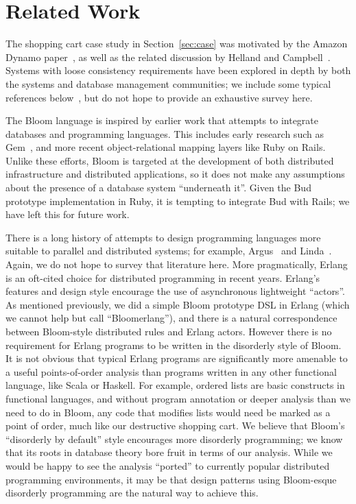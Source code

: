 \section{Related Work}
\label{sec:relwork}
The shopping cart case study in Section~\ref{sec:case} was motivated by the
Amazon Dynamo paper~\cite{dynamo}, as well as the related discussion by Helland
and Campbell~\cite{quicksand}. Systems with loose consistency requirements have
been explored in depth by both the systems and database management communities; we include some typical references below~\cite{sagas,gray1996dangers,leases,bayou}, but do not hope to provide an exhaustive survey here.

The Bloom language is inspired by earlier work that attempts to integrate
databases and programming languages.  This includes early research such as Gem~\cite{gem}, and more recent
object-relational mapping layers like Ruby on Rails.  Unlike these efforts, Bloom is targeted at the development of both distributed infrastructure and distributed applications, so it does not make any assumptions about the presence of a database system ``underneath it''.  Given the Bud prototype implementation in Ruby, it is tempting to integrate Bud with Rails; we have left this for future work.

There is a long history of attempts to design programming languages more
suitable to parallel and distributed systems; for example, Argus~\cite{argus}
and Linda~\cite{linda}.  Again, we do not hope to survey that literature here.  More pragmatically, Erlang is an oft-cited choice for distributed programming in recent years.  Erlang's features and design style encourage the use of asynchronous lightweight ``actors''.  As mentioned previously, we did a simple Bloom prototype DSL in Erlang (which we cannot help but call ``Bloomerlang''), and there is a natural correspondence between Bloom-style distributed rules and Erlang actors.  However there is no requirement for Erlang programs to be written in the disorderly style of Bloom. It is not obvious that typical Erlang programs are significantly more amenable to a useful points-of-order analysis than programs written in any other functional language, like Scala or Haskell.  For example, ordered lists are basic constructs in functional languages, and without program annotation or deeper analysis than we need to do in Bloom, any code that modifies lists would need be marked as a point of order, much like our destructive shopping cart.  We believe that Bloom's ``disorderly by default'' style encourages more disorderly programming; we know that its roots in database theory bore fruit in terms of our analysis.  While we would be happy to see the analysis ``ported'' to currently popular distributed programming environments, it may be that design patterns using Bloom-esque disorderly programming are the natural way to achieve this.

